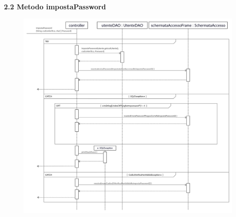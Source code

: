 \documentclass[a4paper,12pt]{article}
\begin{document}
\newpage\null{}\setcounter{page}{6}
\begin{flushleft}
\vspace*{+2cm}
{\bf\normalsize 2.2 Metodo impostaPassword }
\begin{center}
	\begin{figure}[h]
	\centering
 	\includegraphics[width=1\textwidth]{impostaPassword.jpg}
	\end{figure}
\end{center}
\end{flushleft}
\newpage
\end{document}
